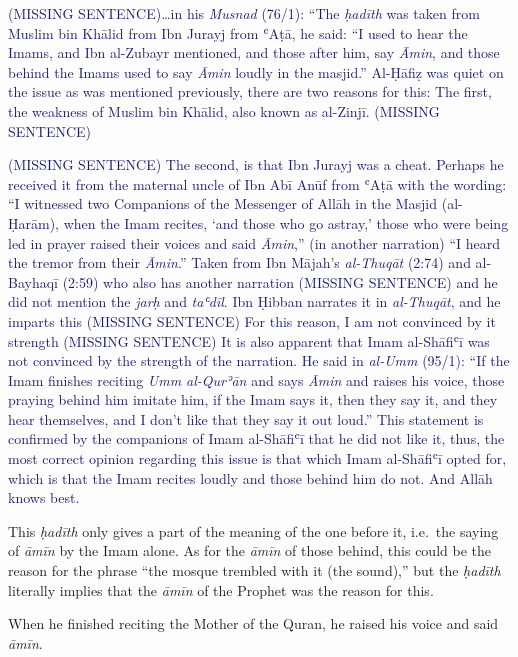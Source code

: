 \textcolor{MidnightBlue}{(MISSING SENTENCE)\ldots{}in
his \emph{Musnad} (76/1): ``The \emph{ḥadīth} was taken from Muslim bin
Khālid from Ibn Jurayj from ʿAṭā, he said: ``I used to hear the Imams,
and Ibn al-Zubayr mentioned, and those after him, say \emph{Āmin}, and
those behind the Imams used to say \emph{Āmin} loudly in the masjid.''
Al-Ḥāfiẓ was quiet on the issue as was mentioned previously, there are
two reasons for this: The first, the weakness of Muslim bin Khālid, also
known as al-Zinjī. (MISSING SENTENCE)}

\textcolor{MidnightBlue}{(MISSING SENTENCE) The
second, is that Ibn Jurayj was a cheat. Perhaps he received it from the
maternal uncle of Ibn Abī Anūf from ʿAṭā with the wording: ``I witnessed
two Companions of the Messenger of Allāh \pbuh in the Masjid (al-Ḥarām),
when the Imam recites, `and those who go astray,' those who were being
led in prayer raised their voices and said \emph{Āmin},'' (in another
narration) ``I heard the tremor from their \emph{Āmin}.'' Taken from Ibn
Mājah's \emph{al-Thuqāt} (2:74) and al-Bayhaqī (2:59) who also has
another narration (MISSING SENTENCE) and he did not mention the
\emph{jarḥ} and \emph{taʿdīl}. Ibn Ḥibban narrates it in
\emph{al-Thuqāt}, and he imparts this (MISSING SENTENCE) For this
reason, I am not convinced by it strength (MISSING SENTENCE) It is also
apparent that Imam al-Shāfiʿī was not convinced by the strength of the
narration. He said in \emph{al-Umm} (95/1): ``If the Imam finishes
reciting \emph{Umm al-Qurʾān} and says \emph{Āmin} and raises his voice,
those praying behind him imitate him, if the Imam says it, then they say
it, and they hear themselves, and I don't like that they say it out
loud.'' This statement is confirmed by the companions of Imam al-Shāfiʿī
that he did not like it, thus, the most correct opinion regarding this
issue is that which Imam al-Shāfiʿī opted for, which is that the Imam
recites loudly and those behind him do not. And Allāh knows best.}

This \emph{ḥadīth} only gives a part of the meaning of the one before
it, i.e.~the saying of \emph{āmīn} by the Imam alone. As for the
\emph{āmīn} of those behind, this could be the reason for the phrase
``the mosque trembled with it (the sound),'' but the \emph{ḥadīth}
literally implies that the \emph{āmīn} of the Prophet \pbuh was the
reason for this.

\begin{mdframed}[style=narration, frametitle={Narration}]
When he finished reciting the Mother of the Quran, he raised his voice and said \textit{āmīn}.
\end{mdframed}

